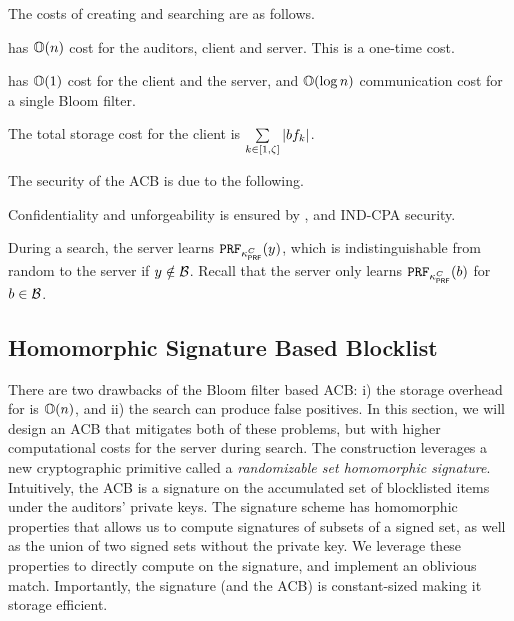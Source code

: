 %
The costs of creating and searching are as follows.

\itemListStart
\item \createBlocklist has $\mathbb{O}(n)$ cost for the auditors, client and server. This is a one-time cost.
\item \searchBlocklist has $\mathbb{O}(1)$ cost for the client and the server, and $\mathbb{O}(\log n)$ communication cost for a single Bloom filter. 
\item The total storage cost for the client is $\sum\limits_{\bloomFilterIdx \in [1, \numBins]} |\bloomFilter[\bloomFilterIdx]|$.
\itemListEnd 

%
The security of the ACB is due to the following.

\itemListStart
\item Confidentiality and unforgeability is ensured by \authOPRFFunc, and IND-CPA security. 
\item During a search, the server learns $\prf{\prfKeyClient}(\genericCInputElmt)$, which is indistinguishable from random to the server if $\genericCInputElmt \notin \blocklist$. Recall that the server only learns $\prf{\prfKeyClient}(\genericBlocklistElmt)$ for $\genericBlocklistElmt \in \blocklist$.
\itemListEnd

\subsection{Homomorphic Signature Based Blocklist}
\label{sec:sig_acb}
%
There are two drawbacks of the Bloom filter based ACB: i) the storage overhead for \blklistToken is $\mathbb{O}(n)$, and ii) the search can produce false positives. In this section, we will design an ACB that mitigates both of these problems, but with higher computational costs for the server during search. The construction leverages a new cryptographic primitive called a \emph{randomizable set homomorphic signature}. Intuitively, the ACB is a signature on the accumulated set of blocklisted items~\cite{johnson2002homomorphic} under the auditors' private keys. The signature scheme has homomorphic properties that allows us to compute signatures of subsets of a signed set, as well as the union of two signed sets without the private key. We leverage these properties to directly compute on the signature, and implement an oblivious match. Importantly, the signature (and the ACB) is constant-sized making it storage efficient.





